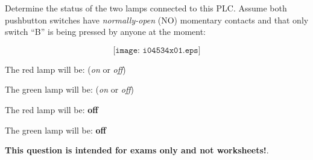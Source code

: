 

Determine the status of the two lamps connected to this PLC.  Assume both pushbutton switches have {\it normally-open} (NO) momentary contacts and that only switch ``B'' is being pressed by anyone at the moment:

$$\texttt{[image: i04534x01.eps]}$$

\vskip 10pt

The red lamp will be: ({\it on} or {\it off})

\vskip 10pt

The green lamp will be: ({\it on} or {\it off})







The red lamp will be: {\bf off}

\vskip 10pt

The green lamp will be: {\bf off}







{\bf This question is intended for exams only and not worksheets!}.


